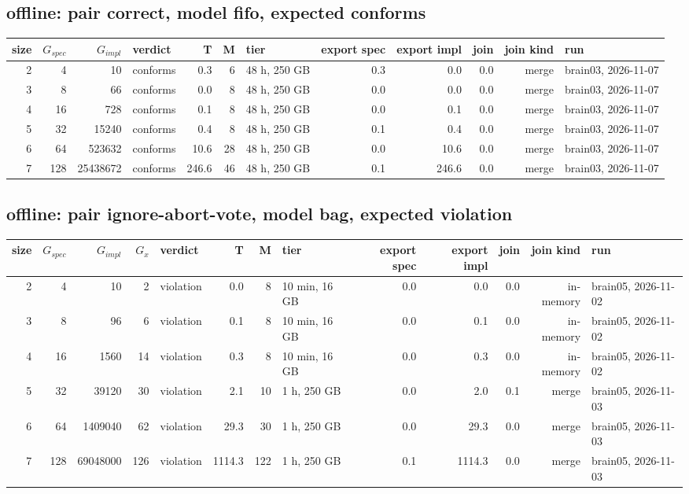 \documentclass[10pt]{article}
\begin{document}
\subsection*{offline: pair \textsf{correct}, model fifo, expected conforms}
\begin{longtable}{@{}rrrlrrlrrrrl@{}}
\toprule
size & $G_{\mathit{spec}}$ & $G_{\mathit{impl}}$ & verdict & T & M & tier & export spec & export impl & join & join kind & run \\
\midrule
\endhead
\color{blue} 2 & 4 & 10 & conforms & 0.3 & 6 & 48 h, 250 GB & 0.3 & 0.0 & 0.0 & merge & brain03, 2026-11-07 \\
\color{blue} 3 & 8 & 66 & conforms & 0.0 & 8 & 48 h, 250 GB & 0.0 & 0.0 & 0.0 & merge & brain03, 2026-11-07 \\
\color{blue} 4 & 16 & 728 & conforms & 0.1 & 8 & 48 h, 250 GB & 0.0 & 0.1 & 0.0 & merge & brain03, 2026-11-07 \\
\color{blue} 5 & 32 & 15240 & conforms & 0.4 & 8 & 48 h, 250 GB & 0.1 & 0.4 & 0.0 & merge & brain03, 2026-11-07 \\
\color{blue} 6 & 64 & 523632 & conforms & 10.6 & 28 & 48 h, 250 GB & 0.0 & 10.6 & 0.0 & merge & brain03, 2026-11-07 \\
\color{blue} 7 & 128 & 25438672 & conforms & 246.6 & 46 & 48 h, 250 GB & 0.1 & 246.6 & 0.0 & merge & brain03, 2026-11-07 \\
\bottomrule
\end{longtable}
\subsection*{offline: pair \textsf{ignore-abort-vote}, model bag, expected violation}
\begin{longtable}{@{}rrrrlrrlrrrrl@{}}
\toprule
size & $G_{\mathit{spec}}$ & $G_{\mathit{impl}}$ & $G_x$ & verdict & T & M & tier & export spec & export impl & join & join kind & run \\
\midrule
\endhead
\color{red} 2 & 4 & 10 & 2 & violation & 0.0 & 8 & 10 min, 16 GB & 0.0 & 0.0 & 0.0 & in-memory & brain05, 2026-11-02 \\
\color{red} 3 & 8 & 96 & 6 & violation & 0.1 & 8 & 10 min, 16 GB & 0.0 & 0.1 & 0.0 & in-memory & brain05, 2026-11-02 \\
\color{red} 4 & 16 & 1560 & 14 & violation & 0.3 & 8 & 10 min, 16 GB & 0.0 & 0.3 & 0.0 & in-memory & brain05, 2026-11-02 \\
\color{blue} 5 & 32 & 39120 & 30 & violation & 2.1 & 10 & 1 h, 250 GB & 0.0 & 2.0 & 0.1 & merge & brain05, 2026-11-03 \\
\color{blue} 6 & 64 & 1409040 & 62 & violation & 29.3 & 30 & 1 h, 250 GB & 0.0 & 29.3 & 0.0 & merge & brain05, 2026-11-03 \\
\color{blue} 7 & 128 & 69048000 & 126 & violation & 1114.3 & 122 & 1 h, 250 GB & 0.1 & 1114.3 & 0.0 & merge & brain05, 2026-11-03 \\
\bottomrule
\end{longtable}
\end{document}
